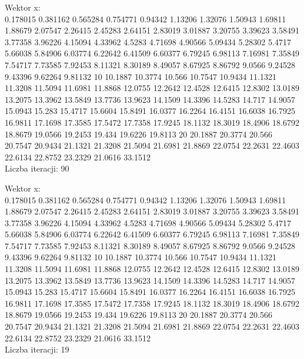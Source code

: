 \documentclass{article}
\begin{document}
    \begin{center}
      \begin{tcolorbox}
        Wektor x:\\ 
        0.178015 0.381162 0.565284 0.754771 0.94342 1.13206 1.32076 1.50943 1.69811 1.88679 2.07547 2.26415 2.45283 2.64151 2.83019 3.01887 3.20755 3.39623 3.58491 3.77358 3.96226 4.15094 4.33962 4.5283 4.71698 4.90566 5.09434 5.28302 5.4717 5.66038 5.84906 6.03774 6.22642 6.41509 6.60377 6.79245 6.98113 7.16981 7.35849 7.54717 7.73585 7.92453 8.11321 8.30189 8.49057 8.67925 8.86792 9.0566 9.24528 9.43396 9.62264 9.81132 10 10.1887 10.3774 10.566 10.7547 10.9434 11.1321 11.3208 11.5094 11.6981 11.8868 12.0755 12.2642 12.4528 12.6415 12.8302 13.0189 13.2075 13.3962 13.5849 13.7736 13.9623 14.1509 14.3396 14.5283 14.717 14.9057 15.0943 15.283 15.4717 15.6604 15.8491 16.0377 16.2264 16.4151 16.6038 16.7925 16.9811 17.1698 17.3585 17.5472 17.7358 17.9245 18.1132 18.3019 18.4906 18.6792 18.8679 19.0566 19.2453 19.434 19.6226 19.8113 20 20.1887 20.3774 20.566 20.7547 20.9434 21.1321 21.3208 21.5094 21.6981 21.8869 22.0754 22.2631 22.4603 22.6134 22.8752 23.2329 21.0616 33.1512\\
        Liczba iteracji: 90
      \end{tcolorbox}

      \begin{flushleft}
      \end{flushleft}

        \begin{tcolorbox}
          Wektor x:\\
          0.178015 0.381162 0.565284 0.754771 0.94342 1.13206 1.32076 1.50943 1.69811 1.88679 2.07547 2.26415 2.45283 2.64151 2.83019 3.01887 3.20755 3.39623 3.58491 3.77358 3.96226 4.15094 4.33962 4.5283 4.71698 4.90566 5.09434 5.28302 5.4717 5.66038 5.84906 6.03774 6.22642 6.41509 6.60377 6.79245 6.98113 7.16981 7.35849 7.54717 7.73585 7.92453 8.11321 8.30189 8.49057 8.67925 8.86792 9.0566 9.24528 9.43396 9.62264 9.81132 10 10.1887 10.3774 10.566 10.7547 10.9434 11.1321 11.3208 11.5094 11.6981 11.8868 12.0755 12.2642 12.4528 12.6415 12.8302 13.0189 13.2075 13.3962 13.5849 13.7736 13.9623 14.1509 14.3396 14.5283 14.717 14.9057 15.0943 15.283 15.4717 15.6604 15.8491 16.0377 16.2264 16.4151 16.6038 16.7925 16.9811 17.1698 17.3585 17.5472 17.7358 17.9245 18.1132 18.3019 18.4906 18.6792 18.8679 19.0566 19.2453 19.434 19.6226 19.8113 20 20.1887 20.3774 20.566 20.7547 20.9434 21.1321 21.3208 21.5094 21.6981 21.8869 22.0754 22.2631 22.4603 22.6134 22.8752 23.2329 21.0616 33.1512\\
          Liczba iteracji: 19
        \end{tcolorbox}



\end{center}
\end{document}
